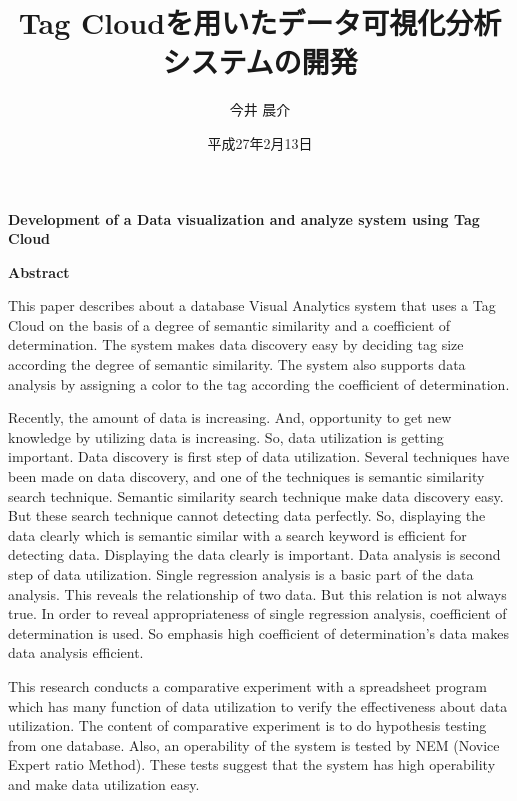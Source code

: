 \documentclass[sotsuron]{kuee}
\title{Tag Cloudを用いたデータ可視化分析システムの開発}
\author{今井 晨介}
\date{平成27年2月13日}
\begin{document}
\begin{center}
\textbf{{\Large Development of a Data visualization and analyze system using Tag Cloud}}
\end{center}

\begin{center}
\textbf{{\Large Abstract}}
\end{center}

This paper describes about a database Visual Analytics system that uses a Tag Cloud on the basis of a degree of semantic similarity and a coefficient of determination. The system makes data discovery easy by deciding tag size according the degree of semantic similarity. The system also supports data analysis by assigning a color to the tag according the coefficient of determination.

Recently, the amount of data is increasing. And, opportunity to get new knowledge by utilizing data is increasing. So, data utilization is getting important. Data discovery is first step of data utilization.  Several techniques have been made on data discovery, and one of the techniques is semantic similarity search technique. Semantic similarity search technique make data discovery easy. But these search technique cannot detecting data perfectly. So, displaying the data clearly which is semantic similar with a search keyword is efficient for detecting data. Displaying the data clearly is important.
Data analysis is second step of data utilization. Single regression analysis is a basic part of the data analysis. This reveals the relationship of two data. But this relation is not always true. In order to reveal appropriateness of single regression analysis, coefficient of determination is used. So emphasis high coefficient of determination’s data makes data analysis efficient.

This research conducts a comparative experiment with a spreadsheet program which has many function of data utilization to verify the effectiveness about data utilization. The content of comparative experiment is to do hypothesis testing from one database. Also, an operability of the system is tested by NEM (Novice Expert ratio Method). These tests suggest that the system has high operability and make data utilization easy.


\maketitle			%
\tableofcontents		%
\end{document}
